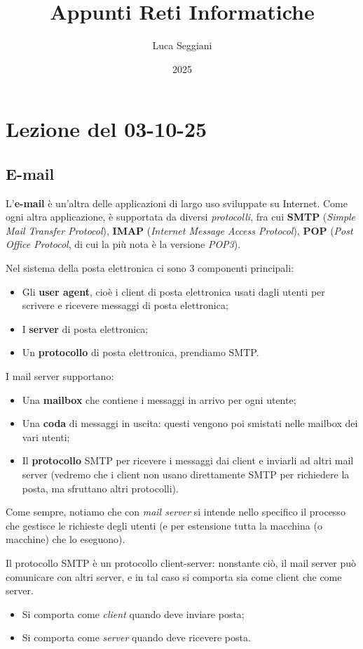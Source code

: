 \documentclass[a4paper,11pt]{article}
\title{Appunti Reti Informatiche}
\author{Luca Seggiani}
\date{2025}
\begin{document}
\section{Lezione del 03-10-25}

\thispagestyle{empty}
\pagestyle{fancy}

\subsection{E-mail}
L'\textbf{e-mail} è un'altra delle applicazioni di largo uso sviluppate su Internet. Come ogni altra applicazione, è supportata da diversi \textit{protocolli}, fra cui \textbf{SMTP} (\textit{Simple Mail Transfer Protocol}), \textbf{IMAP} (\textit{Internet Message Access Protocol}), \textbf{POP} (\textit{Post Office Protocol}, di cui la più nota è la versione \textit{POP3}).

Nel sistema della posta elettronica ci sono 3 componenti principali:
\begin{itemize}
	\item Gli \textbf{user agent}, cioè i client di posta elettronica usati dagli utenti per scrivere e ricevere messaggi di posta elettronica;
	\item I \textbf{server} di posta elettronica;
	\item Un \textbf{protocollo} di posta elettronica, prendiamo SMTP. 
\end{itemize}

I mail server supportano:
\begin{itemize}
	\item Una \textbf{mailbox} che contiene i messaggi in arrivo per ogni utente;
	\item Una \textbf{coda} di messaggi in uscita: questi vengono poi smistati nelle mailbox dei vari utenti;
	\item Il \textbf{protocollo} SMTP per ricevere i messaggi dai client e inviarli ad altri mail server (vedremo che i client non usano direttamente SMTP per richiedere la posta, ma sfruttano altri protocolli).
\end{itemize}

Come sempre, notiamo che con \textit{mail server} si intende nello specifico il processo che gestisce le richieste degli utenti (e per estensione tutta la macchina (o macchine) che lo eseguono).

Il protocollo SMTP è un protocollo client-server: nonstante ciò, il mail server può comunicare con altri server, e in tal caso si comporta sia come client che come server.
\begin{itemize}
	\item Si comporta come \textit{client} quando deve inviare posta;
	\item Si comporta come \textit{server} quando deve ricevere posta.
\end{itemize}
\end{document}

